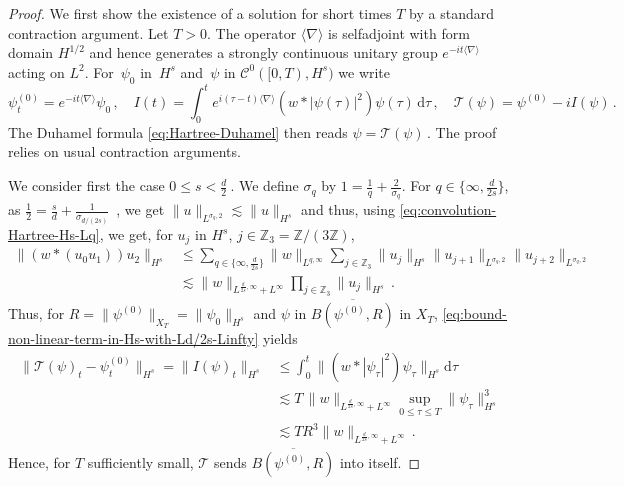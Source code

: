 \documentclass[12pt]{article}
\theoremstyle{plain}
\begin{document}
\begin{proof}
We first show the existence of a  solution for short times $T$ by a
standard contraction argument. Let $T>0$. The operator $\langle\nabla\rangle$
is selfadjoint with form domain $H^{1/2}$ and hence generates a strongly
continuous unitary group $e^{-it\langle\nabla\rangle}$ acting on $L^{2}$. For~$\psi_{0}$ in~$H^{s}$
and~$\psi$ in $\mathcal{C}^{0}([0,T),H^{s})$ we write 
\[
\label{eq: integral op}
\psi^{(0)}_t=e^{-it\langle\nabla\rangle}\psi_{0}\,,\quad I(t)=\int_{0}^{t}e^{i(\tau-t)\langle\nabla\rangle}(w*|\psi(\tau)|^{2})\psi(\tau)\,\mathrm{d}\tau\,,\quad\mathcal{T}(\psi)=\psi^{(0)}-iI(\psi)\,.
\]
The Duhamel formula \eqref{eq:Hartree-Duhamel} then reads $\psi=\mathcal{T}(\psi)\,.$
The proof relies on usual contraction arguments.

We consider first the case $0\leq s<\frac{d}{2}~$. We define $\sigma_{q}$
by $1=\frac{1}{q}+\frac{2}{\sigma_{q}}$. For $q\in\{\infty,\frac{d}{2s}\}$,
as $\frac{1}{2}=\frac{s}{d}+\frac{1}{\sigma_{d/(2s)}}$~, we get
$\|u\|_{L^{\sigma_{q},2}}\lesssim\|u\|_{H^{s}}$ and thus, using \eqref{eq:convolution-Hartree-Hs-Lq},
we get, for $u_{j}$ in $H^{s}$, $j\in\mathbb{Z}_{3}=\mathbb{Z}/(3\mathbb{Z})$,
\begin{align}
\|(w*(u_{0}u_{1}))u_{2}\|_{H^{s}} & \leq\sum_{q\in\{\infty,\frac{d}{2s}\}}\|w\|_{L^{q,\infty}}\sum_{j\in\mathbb{Z}_{3}}\|u_{j}\|_{H^{s}}\|u_{j+1}\|_{L^{\sigma_{q},2}}\|u_{j+2}\|_{L^{\sigma_{q},2}}\nonumber \\
 & \lesssim\|w\|_{L^{\frac{d}{2s},\infty}+L^{\infty}}\prod_{j\in\mathbb{Z}_{3}}\|u_{j}\|_{H^{s}}\,.\label{eq:bound-non-linear-term-in-Hs-with-Ld/2s-Linfty}
\end{align}
Thus, for $R=\|\psi^{(0)}\|_{X_T}=\|\psi_0\|_{H^s}$ and $\psi$ in $\overline{B(\psi^{(0)},R)}$ in $X_{T}$, 
\eqref{eq:bound-non-linear-term-in-Hs-with-Ld/2s-Linfty} yields
\begin{align*}
\|\mathcal{T}(\psi)_{t}-\psi_{t}^{(0)}\|_{H^{s}}  =\|I(\psi)_{t}\|_{H^{s}}
 & \leq\int_{0}^{t}\|(w*|\psi_{\tau}|^{2})\psi_{\tau}\|_{H^{s}}\mathrm{d}\tau\\
 & \lesssim T \, \|w\|_{L^{\frac{d}{2s},\infty}+L^{\infty}} \sup_{0\leq \tau\leq T}\|\psi_{\tau}\|_{H^{s}}^{3}\\
 & \lesssim TR^{3}\|w\|_{L^{\frac{d}{2s},\infty}+L^{\infty}}\,.
\end{align*}
Hence, for $T$ sufficiently small, $\mathcal{T}$ sends $\overline{B(\psi^{(0)},R)}$
into itself.


\end{proof}
\end{document}
